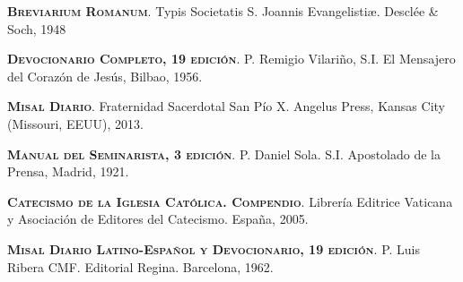 \documentclass[10pt,twoside]{book}
\begin{document}
\textsc{\textbf{Breviarium Romanum}}. Typis Societatis S. Joannis Evangelisti\ae. Desclée \& Soch, 1948

\textsc{\textbf{Devocionario Completo, 19 edición}}. P. Remigio Vilariño, S.I. El Mensajero del Corazón de Jesús, Bilbao, 1956.

\textsc{\textbf{Misal Diario}}. Fraternidad Sacerdotal San Pío X. Angelus Press, Kansas City (Missouri, EEUU), 2013.

\textsc{\textbf{Manual del Seminarista, 3 edición}}. P. Daniel Sola. S.I. Apostolado de la Prensa, Madrid, 1921.

\textsc{\textbf{Catecismo de la Iglesia Católica. Compendio}}. Librería Editrice Vaticana y Asociación de Editores del Catecismo. España, 2005.

\textsc{\textbf{Misal Diario Latino-Español y Devocionario, 19 edición}}. P. Luis Ribera CMF. Editorial Regina. Barcelona, 1962.
\end{document}
